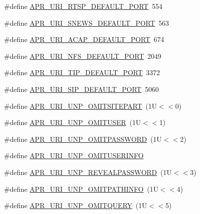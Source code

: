 \begin{DoxyCompactItemize}
\item 
\#define \hyperlink{group___a_p_r___util___u_r_i_gab2aac3d460462c664e848203e8046c3b}{A\-P\-R\-\_\-\-U\-R\-I\-\_\-\-R\-T\-S\-P\-\_\-\-D\-E\-F\-A\-U\-L\-T\-\_\-\-P\-O\-R\-T}~554
\item 
\#define \hyperlink{group___a_p_r___util___u_r_i_ga6333715b343024de16e20b645beb7634}{A\-P\-R\-\_\-\-U\-R\-I\-\_\-\-S\-N\-E\-W\-S\-\_\-\-D\-E\-F\-A\-U\-L\-T\-\_\-\-P\-O\-R\-T}~563
\item 
\#define \hyperlink{group___a_p_r___util___u_r_i_gaf5b775cba93ca7f1778320c33c5a3078}{A\-P\-R\-\_\-\-U\-R\-I\-\_\-\-A\-C\-A\-P\-\_\-\-D\-E\-F\-A\-U\-L\-T\-\_\-\-P\-O\-R\-T}~674
\item 
\#define \hyperlink{group___a_p_r___util___u_r_i_ga94dc176de94e729cf565c87cd6db5ffd}{A\-P\-R\-\_\-\-U\-R\-I\-\_\-\-N\-F\-S\-\_\-\-D\-E\-F\-A\-U\-L\-T\-\_\-\-P\-O\-R\-T}~2049
\item 
\#define \hyperlink{group___a_p_r___util___u_r_i_ga04b234524306cac26f954abad9a15b46}{A\-P\-R\-\_\-\-U\-R\-I\-\_\-\-T\-I\-P\-\_\-\-D\-E\-F\-A\-U\-L\-T\-\_\-\-P\-O\-R\-T}~3372
\item 
\#define \hyperlink{group___a_p_r___util___u_r_i_ga9d9ca5a25b37ad3c41355d902a002622}{A\-P\-R\-\_\-\-U\-R\-I\-\_\-\-S\-I\-P\-\_\-\-D\-E\-F\-A\-U\-L\-T\-\_\-\-P\-O\-R\-T}~5060
\item 
\#define \hyperlink{group___a_p_r___util___u_r_i_gaef80da6212c6838ac15bbcafa1e9745b}{A\-P\-R\-\_\-\-U\-R\-I\-\_\-\-U\-N\-P\-\_\-\-O\-M\-I\-T\-S\-I\-T\-E\-P\-A\-R\-T}~(1\-U$<$$<$0)
\item 
\#define \hyperlink{group___a_p_r___util___u_r_i_ga93a8095f746bb8d4f4e5d8d6ca102ebc}{A\-P\-R\-\_\-\-U\-R\-I\-\_\-\-U\-N\-P\-\_\-\-O\-M\-I\-T\-U\-S\-E\-R}~(1\-U$<$$<$1)
\item 
\#define \hyperlink{group___a_p_r___util___u_r_i_gaed3be741b9a68eb4ee156c6a35b137ff}{A\-P\-R\-\_\-\-U\-R\-I\-\_\-\-U\-N\-P\-\_\-\-O\-M\-I\-T\-P\-A\-S\-S\-W\-O\-R\-D}~(1\-U$<$$<$2)
\item 
\#define \hyperlink{group___a_p_r___util___u_r_i_gad573c75c47cc369ffc0a5776c3613494}{A\-P\-R\-\_\-\-U\-R\-I\-\_\-\-U\-N\-P\-\_\-\-O\-M\-I\-T\-U\-S\-E\-R\-I\-N\-F\-O}
\item 
\#define \hyperlink{group___a_p_r___util___u_r_i_ga527cd70521f12a7962df9976068dda29}{A\-P\-R\-\_\-\-U\-R\-I\-\_\-\-U\-N\-P\-\_\-\-R\-E\-V\-E\-A\-L\-P\-A\-S\-S\-W\-O\-R\-D}~(1\-U$<$$<$3)
\item 
\#define \hyperlink{group___a_p_r___util___u_r_i_ga95d614636f08ee93fbfc341f2ac664c2}{A\-P\-R\-\_\-\-U\-R\-I\-\_\-\-U\-N\-P\-\_\-\-O\-M\-I\-T\-P\-A\-T\-H\-I\-N\-F\-O}~(1\-U$<$$<$4)
\item 
\#define \hyperlink{group___a_p_r___util___u_r_i_ga41a4ebcf1930bcbd81aada6e3a06008b}{A\-P\-R\-\_\-\-U\-R\-I\-\_\-\-U\-N\-P\-\_\-\-O\-M\-I\-T\-Q\-U\-E\-R\-Y}~(1\-U$<$$<$5)
\end{DoxyCompactItemize}
